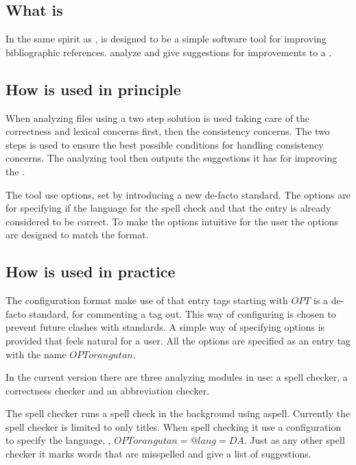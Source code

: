 \subsection{What is {\orangutan}}

In the same spirit as {\bibtex}, {\orangutan} is designed to be a
simple software tool for improving bibliographic references.
{\orangutan} analyze and give suggestions for improvements to a
.


\subsection{How {\orangutan} is used in principle}

When analyzing {\bibtex} files using a two step solution is used
taking care of the correctness and lexical concerns first, then the
consistency concerns.  The two steps is used to ensure the best
possible conditions for handling consistency concerns.  The analyzing
tool then outputs the suggestions it has for improving the .

The tool use options, set by introducing a new de-facto standard.  The
options are for specifying if the language for the spell check and
that the entry is already considered to be correct.  To make the
options intuitive for the {\bibtex} user the options are designed to
match the {\bibtex} format.


\subsection{How {\orangutan} is used in practice}

The configuration format make use of that entry tags starting with
$OPT$ is a de-facto standard, for commenting a tag out.  This way of
configuring is chosen to prevent future clashes with standards.  A
simple way of specifying options is provided that feels natural for a
{\bibtex} user.  All the options are specified as an entry tag with
the name $OPTorangutan$.

In the current version there are three analyzing modules in use: a
spell checker, a correctness checker and an abbreviation checker.

The spell checker runs a spell check in the background using aspell.
Currently the spell checker is limited to only titles.  When spell
checking it use a configuration to specify the language, \eg,
$OPTorangutan = {@lang=DA}$.  Just as any other spell checker it marks
words that are misspelled and give a list of suggestions.

